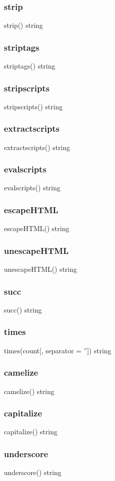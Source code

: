 {{\subsubsection*{strip}
strip() \rightarrow string
\subsubsection*{striptags}
striptags() \rightarrow string
\subsubsection*{stripscripts}
stripscripts() \rightarrow string
\subsubsection*{extractscripts}
extractscripts() \rightarrow string
\subsubsection*{evalscripts}
evalscripts() \rightarrow string
\subsubsection*{escapeHTML}
escapeHTML() \rightarrow string
\subsubsection*{unescapeHTML}
unescapeHTML() \rightarrow string
\subsubsection*{succ}
succ() \rightarrow string
\subsubsection*{times}
times(count[, separator = '']) \rightarrow string
\subsubsection*{camelize}
camelize() \rightarrow string
\subsubsection*{capitalize}
capitalize() \rightarrow string
\subsubsection*{underscore}
underscore() \rightarrow string
}}
